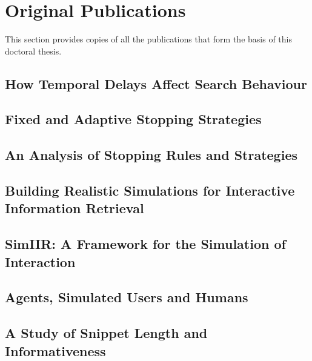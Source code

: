 
\chapter{Original Publications}\label{appx:publications}
This section provides copies of all the publications that form the basis of this doctoral thesis.

\newpage
\section{How Temporal Delays Affect Search Behaviour}

\newpage
\section{Fixed and Adaptive Stopping Strategies}

\newpage
\section{An Analysis of Stopping Rules and Strategies}

\newpage
\section{Building Realistic Simulations for Interactive Information Retrieval}

\newpage
\section{SimIIR: A Framework for the Simulation of Interaction}

\newpage
\section{Agents, Simulated Users and Humans}

\newpage
\section{A Study of Snippet Length and Informativeness}
